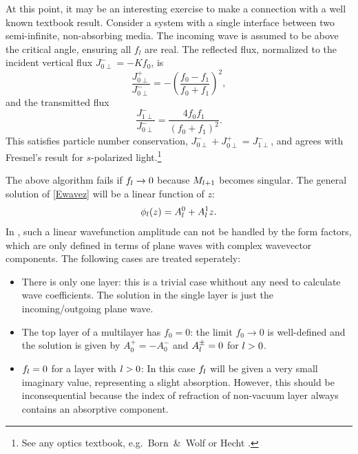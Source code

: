 At this point,
it may be an interesting exercise to make
 a connection with a well known textbook result.
Consider a system
with a single interface between two semi-infinite,
non-absorbing media. The incoming wave is assumed to be above the
critical angle, ensuring all $f_l$ are real.
The reflected flux,
normalized to the incident vertical flux $J_{0\perp}^-=-Kf_0$,
is
%
\begin{equation}
  \frac{J_{0\perp}^+}{J_{0\perp}^-}
  = - \left(\frac{f_0-f_1}{f_0+f_1}\right)^2,
\end{equation}
and the transmitted flux
%
\begin{equation}
  \frac{J_{1\perp}^-}{J_{0\perp}^-}
  = \frac{4f_0 f_1}{(f_0+f_1)^2}.
\end{equation}
This satisfies particle number conservation, $J_{0\perp}^-+J_{0\perp}^+=J_{1\perp}^-$,
and agrees with Fresnel's result for $s$-polarized light.\footnote
{See any optics textbook, e.g.\ Born~\&~Wolf \cite[ch.~1.5.2]{BoWo99}
  or Hecht \cite[ch.~4.6.2]{Hec02}.}

The above algorithm fails if $f_{l}\to0$
because $M_{l+1}$ becomes singular.
The general solution of \cref{Ewavez} will be a linear function of $z$:
\begin{equation}
  \phi_{l}(z) = A^0_{l} + A^1_{l}z.
\end{equation}
In \BornAgain, such a linear wavefunction amplitude can not be handled by the form factors,
which are only defined in terms of plane waves with complex wavevector components.
The following cases are treated seperately:
\begin{itemize}
  \item There is only one layer: this is a trivial case whithout any need to calculate wave coefficients.
    The solution in the single layer is just the incoming/outgoing plane wave.
  \item The top layer of a multilayer has $f_0=0$: the limit $f_0\to0$ is well-defined and the
    solution is given by $A^+_0 = -A^-_0$ and $A^{\pm}_{l}=0$ for $l>0$.
  \item $f_{l}=0$ for a layer with $l>0$: In this case $f_{l}$ will be given a very small imaginary value,
    representing a slight absorption. However, this should be inconsequential because the index of refraction
    of non-vacuum layer always contains an absorptive component.
\end{itemize}

%
